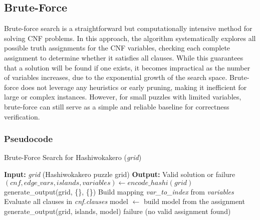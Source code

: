 \subsection{Brute-Force}

\noindent Brute-force search is a straightforward but computationally intensive method for solving CNF problems. In this approach, the algorithm systematically explores all possible truth assignments for the CNF variables, checking each complete assignment to determine whether it satisfies all clauses. While this guarantees that a solution will be found if one exists, it becomes impractical as the number of variables increases, due to the exponential growth of the search space. Brute-force does not leverage any heuristics or early pruning, making it inefficient for large or complex instances. However, for small puzzles with limited variables, brute-force can still serve as a simple and reliable baseline for correctness verification.
\subsubsection{Pseudocode}
\begin{algorithm}[H]
	\caption{Brute-Force Search for Hashiwokakero (\textit{grid})}
	\label{alg:brute_force_hashiwokakero}
	\begin{algorithmic}[1]
		\State \textbf{Input:} \textit{grid} (Hashiwokakero puzzle grid)
		\State \textbf{Output:} Valid solution or failure
		\State $(cnf, edge\_vars, islands, variables) \gets encode\_hashi(grid)$
		\State \Return generate\_output(grid, \{\}, \{\})
		\EndIf
		\State Build mapping \textit{var\_to\_index} from \textit{variables}
		\State Evaluate all clauses in \textit{cnf.clauses}
		\State model $\gets$ build model from the assignment
		\State \Return generate\_output(grid, islands, model)
		\EndIf
		\EndIf
		\EndFor
		\State \Return failure (no valid assignment found)
	\end{algorithmic}
\end{algorithm}


